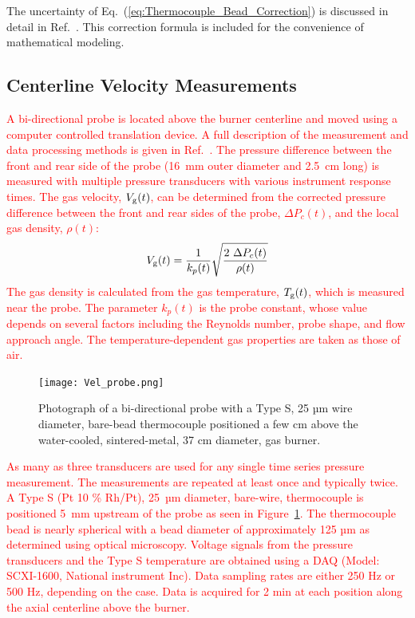 \documentclass[12pt]{article}
\begin{document}
The uncertainty of Eq.~(\ref{eq:Thermocouple_Bead_Correction}) is discussed in detail in Ref.~\cite{Sung2019}. This correction formula is included for the convenience of mathematical modeling.

\subsection{Centerline Velocity Measurements}
\label{ssec:Velocity_Measurements}
\textcolor{red}{A bi-directional probe is located above the burner centerline and moved using a computer controlled translation device. A full description of the measurement and data processing methods is given in Ref.~\cite{Sung2021}. The pressure difference between the front and rear side of the probe (16~mm outer diameter and 2.5~cm  long) is measured with multiple pressure transducers with various instrument response times. The gas velocity, $V_{\rm{g}}(t)$, can be determined from the corrected pressure difference between the front and rear sides of the probe, $\Delta P_{c}(t)$, and the local gas density, $\rho(t)$:}
\begin{equation}\label{eq:Vel_g}
V_{\rm{g}}(t) = \frac{1}{k_p(t)}\sqrt{\frac{2~\Delta P_{c}(t)}{\rho(t)}}
\end{equation}
\textcolor{red}{The gas density is calculated from the gas temperature, $ {T_{\rm g}(t)}$, which is measured near the probe. The parameter $k_p(t)$ is the probe constant, whose value depends on several factors including the Reynolds number, probe shape, and flow approach angle. The temperature-dependent gas properties are taken as those of air.}
\begin{figure}[h!]
	\centering
\texttt{[image: Vel\_probe.png]}
	\caption[Photograph of a bi-directional probe]{Photograph of a bi-directional probe with a Type S, 25 µm wire diameter, bare-bead thermocouple positioned a few cm above the water-cooled, sintered-metal, 37 cm diameter, gas burner.}
	\label{fig:Vel_Probe}
\end{figure}
\textcolor{red}{As many as three transducers are used for any single time series pressure measurement. The measurements are repeated at least once and typically twice. A Type S (Pt 10 \% Rh/Pt), 25~µm diameter, bare-wire, thermocouple is positioned 5~mm upstream of the probe as seen in Figure~\ref{fig:Vel_Probe}. The thermocouple bead is nearly spherical with a bead diameter of approximately 125 µm as determined using optical microscopy. Voltage signals from the pressure transducers and the Type S temperature are obtained using a DAQ (Model: SCXI-1600, National instrument Inc). Data sampling rates are either 250 Hz or 500 Hz, depending on the case. Data is acquired for 2 min at each position along the axial centerline above the burner.}
\end{document}
